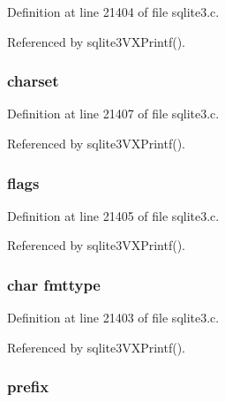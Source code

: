 Definition at line 21404 of file sqlite3.\+c.



Referenced by sqlite3\+V\+X\+Printf().

\hypertarget{structet__info_a8c4ec44bc9dcbbfe94be13508b083c9c}{}
\subsubsection[{charset}]{ charset}\label{structet__info_a8c4ec44bc9dcbbfe94be13508b083c9c}


Definition at line 21407 of file sqlite3.\+c.



Referenced by sqlite3\+V\+X\+Printf().

\hypertarget{structet__info_aec05ac8ae1d08a09ab890a2e82e2d2a7}{}
\subsubsection[{flags}]{ flags}\label{structet__info_aec05ac8ae1d08a09ab890a2e82e2d2a7}


Definition at line 21405 of file sqlite3.\+c.



Referenced by sqlite3\+V\+X\+Printf().

\hypertarget{structet__info_abc4be73f6d5df29d7eeabfa0d62dc266}{}
\subsubsection[{fmttype}]{\setlength{\rightskip}{0pt plus 5cm}char fmttype}\label{structet__info_abc4be73f6d5df29d7eeabfa0d62dc266}


Definition at line 21403 of file sqlite3.\+c.



Referenced by sqlite3\+V\+X\+Printf().

\hypertarget{structet__info_a2925ae756413820fcf5893cee85301c8}{}
\subsubsection[{prefix}]{ prefix}\label{structet__info_a2925ae756413820fcf5893cee85301c8}


